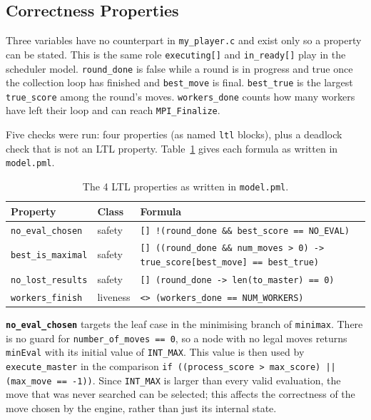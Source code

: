 \documentclass[10pt,a4paper]{article}
\newcommand{\code}[1]{\texttt{#1}}
\begin{document}
\subsection{Correctness Properties}
\label{sec:props-2}

Three variables have no counterpart in \code{my\_player.c} and exist only
so a property can be stated. This is the same role \code{executing[]} and
\code{in\_ready[]} play in the scheduler model. \code{round\_done} is false
while a round is in progress and true once the collection loop has
finished and \code{best\_move} is final. \code{best\_true} is the largest
\code{true\_score} among the round's moves. \code{workers\_done} counts how
many workers have left their loop and can reach \code{MPI\_Finalize}.

Five checks were run: four properties (as named \code{ltl} blocks), plus a
deadlock check that is not an LTL property. Table~\ref{tab:props2} gives
each formula as written in \code{model.pml}.

\begin{table}[htbp]
\centering
\caption{The 4 LTL properties as written in \code{model.pml}.}
\label{tab:props2}
\begin{tabular}{l l p{9.2cm}}
\toprule
\textbf{Property} & \textbf{Class} & \textbf{Formula} \\
\midrule
\code{no\_eval\_chosen} & safety &
\code{[] !(round\_done \&\& best\_score == NO\_EVAL)} \\
\addlinespace
\code{best\_is\_maximal} & safety &
\code{[] ((round\_done \&\& num\_moves > 0) -> true\_score[best\_move] == best\_true)} \\
\addlinespace
\code{no\_lost\_results} & safety &
\code{[] (round\_done -> len(to\_master) == 0)} \\
\addlinespace
\code{workers\_finish} & liveness &
\code{<> (workers\_done == NUM\_WORKERS)} \\
\bottomrule
\end{tabular}
\end{table}

\noindent
\textbf{\code{no\_eval\_chosen}} targets the leaf case in the minimising 
branch of \code{minimax}. There is no guard for \code{number\_of\_moves == 0}, 
so a node with no legal moves returns \code{minEval} with its initial value 
of \code{INT\_MAX}. This value is then used by \code{execute\_master} in the 
comparison \code{if ((process\_score > max\_score) || (max\_move == -1))}. 
Since \code{INT\_MAX} is larger than every valid evaluation, the move that 
was never searched can be selected; this affects the correctness of the move 
chosen by the engine, rather than just its internal state.
\end{document}
